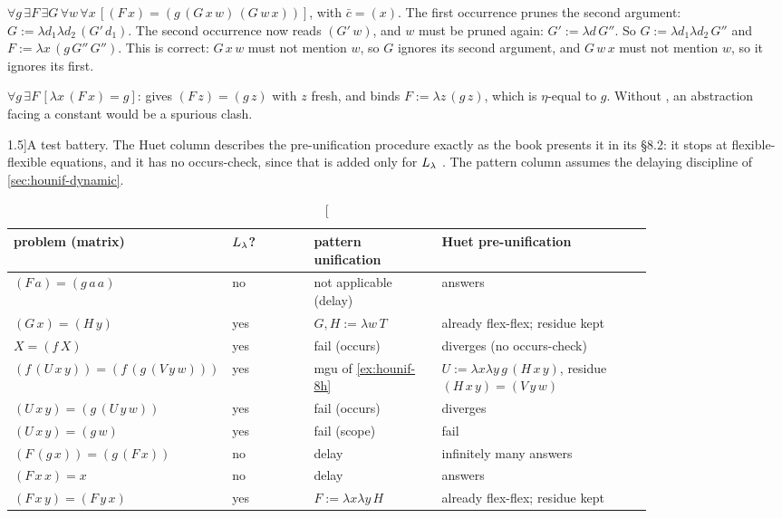 \begin{example}\label{ex:hounif-two}
$\forall g\,\exists F\,\exists G\,\forall w\,\forall x\,[(F\,x)=(g\,(G\,x\,w)\,(G\,w\,x))]$, with $\bar c=(x)$. The first
occurrence prunes the second argument: $G:=\lambda d_1\lambda d_2\,(G'\,d_1)$. The second occurrence now reads $(G'\,w)$,
and $w$ must be pruned again: $G':=\lambda d\,G''$. So $G:=\lambda d_1\lambda d_2\,G''$ and $F:=\lambda x\,(g\,G''\,G'')$. This
is correct: $G\,x\,w$ must not mention $w$, so $G$ ignores its second argument, and $G\,w\,x$ must not mention $w$,
so it ignores its first.
\end{example}

\begin{example}
$\forall g\,\exists F\,[\lambda x\,(F\,x)=g]$:  gives $(F\,z)=(g\,z)$ with $z$ fresh, and 
binds $F:=\lambda z\,(g\,z)$, which is $\eta$-equal to $g$. Without , an abstraction facing a constant
would be a spurious clash.
\end{example}

\begin{table}[t]
\centering\footnotesize
\caption[][1.5\baselineskip]{A test battery. The Huet column describes the pre-unification procedure exactly as the book presents it
in its \S8.2: it stops at flexible-flexible equations, and it has no occurs-check, since that is added only for
$L_\lambda$ . The pattern column assumes the delaying discipline of \cref{sec:hounif-dynamic}.}
\label{tab:hounif-battery}
\begin{tabular}{@{}>{\raggedright\arraybackslash}p{0.29\linewidth}l>{\raggedright\arraybackslash}p{0.2\linewidth}>{\raggedright\arraybackslash}p{0.33\linewidth}@{}}
\toprule
problem (matrix) & $L_\lambda$? & pattern unification & Huet pre-unification \\
\midrule
$(F\,a)=(g\,a\,a)$ & no & not applicable (delay) & 4 answers \\
$(G\,x)=(H\,y)$ & yes & $G,H:=\lambda w\,T$ & already flex-flex; residue kept \\
$X=(f\,X)$ & yes & fail (occurs) & diverges (no occurs-check) \\
$(f\,(U\,x\,y))=(f\,(g\,(V\,y\,w)))$ & yes & mgu of \cref{ex:hounif-8h} & $U:=\lambda x\lambda y\,g\,(H\,x\,y)$, residue $(H\,x\,y)=(V\,y\,w)$ \\
$(U\,x\,y)=(g\,(U\,y\,w))$ & yes & fail (occurs) & diverges \\
$(U\,x\,y)=(g\,w)$ & yes & fail (scope) & fail \\
$(F\,(g\,x))=(g\,(F\,x))$ & no & delay & infinitely many answers \\
$(F\,x\,x)=x$ & no & delay & 2 answers \\
$(F\,x\,y)=(F\,y\,x)$ & yes & $F:=\lambda x\lambda y\,H$ & already flex-flex; residue kept \\
\bottomrule
\end{tabular}
\end{table}


